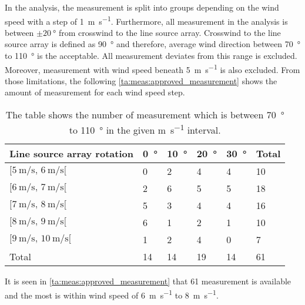 In the analysis, the measurement is split into groups depending on the wind speed with a step of \SI{1}{\meter\per\second}. Furthermore, all measurement in the analysis is between $\pm\SI{20}{\degree}$ from crosswind to the line source array. Crosswind to the line source array is defined as \SI{90}{\degree} and therefore, average wind direction between \SI{70}{\degree} to \SI{110}{\degree} is the acceptable. All measurement deviates from this range is excluded. Moreover, measurement with wind speed beneath \SI{5}{\meter\per\second} is also excluded. From those limitations, the following \autoref{ta:meas:approved_measurement} shows the amount of measurement for each wind speed step. 

\begin{table}[H]
\centering
\caption{The table shows the number of measurement which is between \SI{70}{\degree} to \SI{110}{\degree} in the given \si{\meter\per\second} interval.}
\begin{tabular}{l|l|l|l|l|l}
Line source array rotation & \SI{0}{\degree}  & \SI{10}{\degree} & \SI{20}{\degree} & \SI{30}{\degree} & Total \\ \hline
$[\SI{5}{\meter\per\second},\, \SI{6}{\meter\per\second}[ $         & 0  & 2  & 4  & 4  & 10    \\
$[\SI{6}{\meter\per\second},\, \SI{7}{\meter\per\second}[$           & 2  & 6  & 5  & 5  & 18    \\
$[\SI{7}{\meter\per\second},\, \SI{8}{\meter\per\second}[ $          & 5  & 3  & 4  & 4  & 16    \\
$[\SI{8}{\meter\per\second},\, \SI{9}{\meter\per\second}[ $          & 6  & 1  & 2  & 1  & 10    \\
$[\SI{9}{\meter\per\second},\, \SI{10}{\meter\per\second}[  $        & 1  & 2  & 4  & 0  & 7     \\ \hline
Total         & 14 & 14 & 19 & 14 &   61   
\end{tabular}
\label{ta:meas:approved_measurement}
\end{table}

It is seen in \autoref{ta:meas:approved_measurement} that 61 measurement is available and the most is within wind speed of \SI{6}{\meter\per\second} to \SI{8}{\meter\per\second}.

